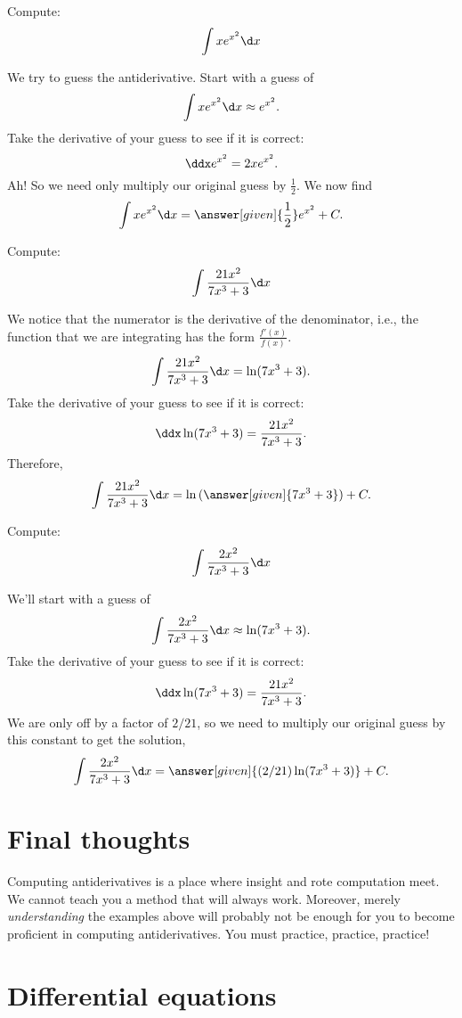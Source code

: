 \documentclass{ximera}
\begin{document}
\begin{example}
Compute:
\[
\int xe^{x^2} \d x
\]
\begin{explanation}
We try to guess the antiderivative. Start with a guess of
\[
\int xe^{x^2} \d x \approx e^{x^2}.
\]
Take the derivative of your guess to see if it is correct:
\[
\ddx e^{x^2} = 2xe^{x^2} .
\]
Ah! So we need only multiply our original guess by $\frac{1}{2}$.  We now
find
\[
\int xe^{x^2} \d x =\answer[given]{\frac{1}{2}}e^{x^2} + C.
\]
\end{explanation}
\end{example}
\begin{example}
Compute:
\[
\int \frac{21x^2}{7x^3 + 3} \d x
\]
\begin{explanation}
We notice that the numerator is the derivative of the denominator, i.e., the function that we are integrating has the form $\frac{f'(x)}{f(x)}$.
\[
\int \frac{21x^2}{7x^3 + 3} \d x = \ln(7x^3+3).
\]
Take the derivative of your guess to see if it is correct:
\[
\ddx \ln(7x^3+3) = \frac{21x^2}{7x^3 + 3}.
\]
Therefore,
\[
\int \frac{21x^2}{7x^3 + 3} \d x = \ln{(\answer[given]{7x^3+3})}+C.
\]
\end{explanation}
\end{example}
\begin{example}
Compute:
\[
\int \frac{2x^2}{7x^3 + 3} \d x
\]
\begin{explanation}
We'll start with a guess of
\[
\int \frac{2x^2}{7x^3 + 3} \d x \approx \ln(7x^3+3).
\]
Take the derivative of your guess to see if it is correct:
\[
\ddx \ln(7x^3+3) = \frac{21x^2}{7x^3 + 3}.
\]
We are only off by a factor of $2/21$, so we need to multiply our
original guess by this constant to get the solution,
\[
\int \frac{2x^2}{7x^3 + 3} \d x = \answer[given]{(2/21)\ln(7x^3+3)}+C.
\]
\end{explanation}
\end{example}

\section{Final thoughts}
Computing antiderivatives is a place where insight and rote
computation meet. We cannot teach you a method that will always
work. Moreover, merely \emph{understanding} the examples above will
probably not be enough for you to become proficient in computing
antiderivatives. You must practice, practice, practice!

\section{Differential equations}
\end{document}
